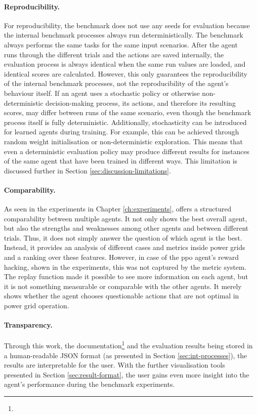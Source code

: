 \paragraph{Reproducibility.}
For reproducibility, the benchmark does not use any seeds for evaluation because the internal benchmark processes always run deterministically. The benchmark always performs the same tasks for the same input scenarios. After the agent runs through the different trials and the actions are saved internally, the evaluation process is always identical when the same run values are loaded, and identical scores are calculated. However, this only guarantees the reproducibility of the internal benchmark processes, not the reproducibility of the agent's behaviour itself. If an agent uses a stochastic policy or otherwise non-deterministic decision-making process, its actions, and therefore its resulting scores, may differ between runs of the same scenario, even though the benchmark process itself is fully deterministic. 
Additionally, stochasticity can be introduced for learned agents during training. For example, this can be achieved through random weight initialisation or non-deterministic exploration. This means that even a deterministic evaluation policy may produce different results for instances of the same agent that have been trained in different ways.
This limitation is discussed further in Section \ref{sec:discussion-limitations}.

\paragraph{Comparability.}
As seen in the experiments in Chapter \ref{ch:experiments}, \benchmark offers a structured comparability between multiple agents. It not only shows the best overall agent, but also the strengths and weaknesses among other agents and between different trials. Thus, it does not simply answer the question of which agent is the best. Instead, it provides an analysis of different cases and metrics inside power grids and a ranking over these features. However, in case of the \ac{ppo} agent's reward hacking, shown in the experiments, this was not captured by the metric system. The replay function made it possible to see more information on each agent, but it is not something measurable or comparable with the other agents. It merely shows whether the agent chooses questionable actions that are not optimal in power grid operation. 

\paragraph{Transparency.}
Through this work, the documentation\footnote{\documentation} and the evaluation results being stored in a human-readable JSON format (as presented in Section \ref{sec:int-processes}), the results are interpretable for the user. With the further visualisation tools presented in Section \ref{sec:result-format}, the user gains even more insight into the agent's performance during the benchmark experiments.

